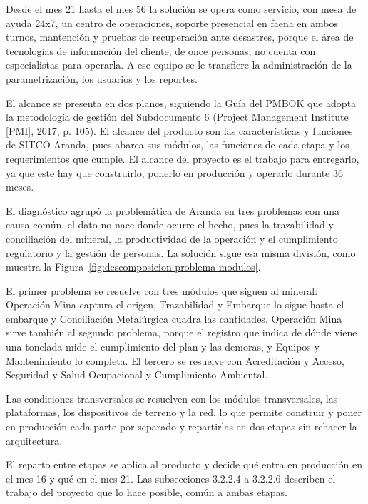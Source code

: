 \documentclass[subdoc]{../../comun/overfore}
\begin{document}
Desde el mes 21 hasta el mes 56 la solución se opera como servicio, con mesa de ayuda 24x7, un centro de operaciones, soporte presencial en faena en ambos turnos, mantención y pruebas de recuperación ante desastres, porque el área de tecnologías de información del cliente, de once personas, no cuenta con especialistas para operarla. A ese equipo se le transfiere la administración de la parametrización, los usuarios y los reportes.

El alcance se presenta en dos planos, siguiendo la Guía del PMBOK que adopta la metodología de gestión del Subdocumento 6 (Project Management Institute [PMI], 2017, p. 105). El alcance del producto son las características y funciones de SITCO Aranda, pues abarca sus módulos, las funciones de cada etapa y los requerimientos que cumple. El alcance del proyecto es el trabajo para entregarlo, ya que este hay que construirlo, ponerlo en producción y operarlo durante 36 meses.

El diagnóstico agrupó la problemática de Aranda en tres problemas con una causa común, el dato no nace donde ocurre el hecho, pues la trazabilidad y conciliación del mineral, la productividad de la operación y el cumplimiento regulatorio y la gestión de personas. La solución sigue esa misma división, como muestra la Figura~\ref{fig:descomposicion-problema-modulos}.

El primer problema se resuelve con tres módulos que siguen al mineral: Operación Mina captura el origen, Trazabilidad y Embarque lo sigue hasta el embarque y Conciliación Metalúrgica cuadra las cantidades. Operación Mina sirve también al segundo problema, porque el registro que indica de dónde viene una tonelada mide el cumplimiento del plan y las demoras, y Equipos y Mantenimiento lo completa. El tercero se resuelve con Acreditación y Acceso, Seguridad y Salud Ocupacional y Cumplimiento Ambiental.

Las condiciones transversales se resuelven con los módulos transversales, las plataformas, los dispositivos de terreno y la red, lo que permite construir y poner en producción cada parte por separado y repartirlas en dos etapas sin rehacer la arquitectura.

El reparto entre etapas se aplica al producto y decide qué entra en producción en el mes 16 y qué en el mes 21. Las subsecciones 3.2.2.4 a 3.2.2.6 describen el trabajo del proyecto que lo hace posible, común a ambas etapas.
\end{document}
